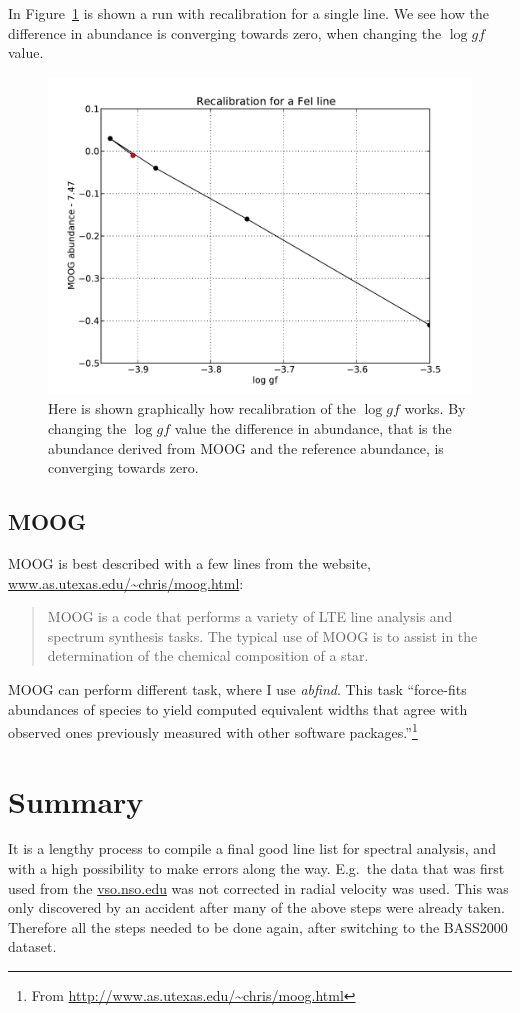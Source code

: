 \documentclass{aa}
\begin{document}
In Figure~\ref{fig:recalFe1} is shown a run with recalibration for a single line. We
see how the difference in abundance is converging towards zero, when changing
the $\log gf$ value.
\begin{figure}[htb!]
    \centering
    \includegraphics[width=0.9\linewidth]{figures/recalFeI.pdf}
    \caption{Here is shown graphically how recalibration of the $\log gf$
        works. By changing the $\log gf$ value the difference in abundance,
        that is the abundance derived from MOOG and the reference abundance,
        is converging towards zero.}
\label{fig:recalFe1}
\end{figure}



\subsection{MOOG}
\label{sub:moog}
MOOG is best described with a few lines from the website,
\url{www.as.utexas.edu/~chris/moog.html}:
\begin{quote}
    MOOG is a code that performs a variety of LTE line analysis and spectrum
    synthesis tasks. The typical use of MOOG is to assist in the determination
    of the chemical composition of a star.
\end{quote}
MOOG can perform different task, where I use \emph{abfind}. This task
``force-fits abundances of species to yield computed equivalent widths that
agree with observed ones previously measured with other software
packages.''\footnote{From \url{http://www.as.utexas.edu/~chris/moog.html}}



\section{Summary}
\label{sec:conclusion}
It is a lengthy process to compile a final good line list for spectral
analysis, and with a high possibility to make errors along the way. E.g.\ the
data that was first used from the \url{vso.nso.edu} was not corrected in radial
velocity was used. This was only discovered by an accident after many of the
above steps were already taken. Therefore all the steps needed to be done
again, after switching to the BASS2000 dataset.
\end{document}
